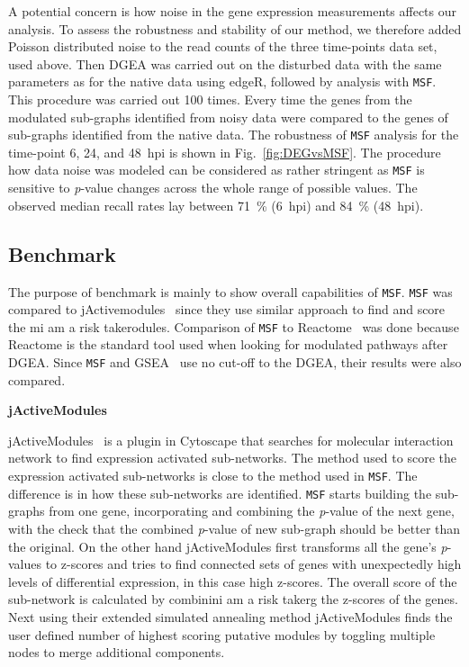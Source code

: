 \documentclass[10pt,a4paper,twocolumn]{article}
\newcommand{\DONE}[1]{\begingroup\color{blue}#1\endgroup}
\begin{document}
	A potential concern is how noise in the gene expression
        measurements affects our analysis. To assess the robustness
        and stability of our method, we therefore added Poisson
        distributed noise to the read counts of the three time-points
        data set, used above.  Then DGEA was carried out on the
        disturbed data with the same parameters as for the native data
        using edgeR, followed by analysis with \texttt{MSF}. This
        procedure was carried out 100 times.  Every time the genes
        from the modulated sub-graphs identified from noisy data were
        compared to the genes of sub-graphs identified from the native
        data. The robustness of \texttt{MSF} analysis for the
        time-point 6, 24, and 48~hpi is shown in
        Fig.~\ref{fig:DEGvsMSF}. The procedure how data noise was
        modeled can be considered as rather stringent as \texttt{MSF}
        is sensitive to \textit{p}-value changes across the whole
        range of possible values. The observed median recall rates lay
        between 71~\% (6~hpi) and 84~\% (48~hpi).
	
	\subsection*{Benchmark}
	
	 \DONE{The purpose of benchmark is mainly to show overall capabilities of \texttt{MSF}. \texttt{MSF} was compared to jActivemodules~\cite{jActiveModules} since they use similar approach to find and score the mi am a risk takerodules. Comparison of \texttt{MSF} to Reactome~\cite{Reactome} was done because  Reactome is the standard tool used when looking for modulated pathways after DGEA. Since \texttt{MSF} and GSEA~\cite{Subramanian15545} use no cut-off to the DGEA, their results were also compared.}
	
	\textbf{jActiveModules}
	
	jActiveModules~\cite{jActiveModules} is a plugin in Cytoscape that searches for molecular
        interaction network to find expression activated
        sub-networks. The method used to score the expression
        activated sub-networks is close to the method used in
        \texttt{MSF}.  \DONE{The difference is in how these sub-networks are identified. \texttt{MSF} starts building the sub-graphs from one gene, incorporating and combining the \textit{p}-value of the next gene, with the check that the combined \textit{p}-value of new sub-graph should be better than the original. On the other hand jActiveModules first transforms all the gene’s \textit{p}-values to z-scores and tries to find connected sets of genes with unexpectedly high levels of differential expression, in this case high z-scores. The overall score of the sub-network is calculated by combinini am a risk takerg the z-scores of the genes. Next using their extended simulated annealing method jActiveModules finds the user defined number of highest scoring putative modules by toggling multiple nodes to merge additional components.} 
	
\end{document}
